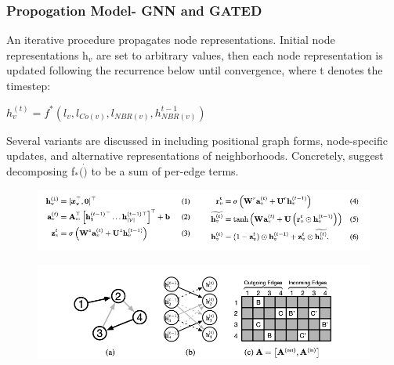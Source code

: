 \documentclass{article}
\begin{document}
\subsubsection{Propogation Model- GNN and GATED}
An iterative procedure propagates node representations. Initial node representations h$_v$ are set to arbitrary values, then each node representation is updated following the recurrence below until convergence, where t denotes the timestep:

\begin{math}
h_v^{(t)} = f^\ast(l_v,l_{Co(v)},l_{NBR(v)}, h^{t-1}_{NBR(v)})
\end{math}

Several variants are discussed in \cite{10.1109/TNN.2008.2005605} including positional graph forms, node-specific updates, and alternative representations of neighborhoods. Concretely, \cite{10.1109/TNN.2008.2005605} suggest decomposing f$_\ast(\dot)$ to be a sum of per-edge terms.

\begin{figure}[ht]
\vskip 0.2in
\begin{center}
\centerline{\includegraphics[width=\columnwidth]{Images/Bug1-1.png}}
\label{icml-historical}
\end{center}
\vskip -0.2in
\end{figure}

\begin{figure}[ht]
\vskip 0.2in
\begin{center}
\centerline{\includegraphics[width=\columnwidth]{Images/Bug1-2.png}}
\label{icml-historical}
\end{center}
\vskip -0.2in
\end{figure}
\end{document}
